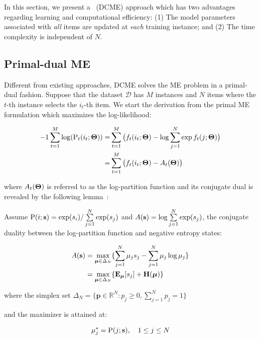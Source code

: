 \section{\DCME{}}\label{sec::dcme_dcme}

In this section, we present a \DCME{}~(DCME) approach which has two advantages
regarding learning and computational efficiency: (1) The model parameters
associated with \emph{all} items are updated at \emph{each} training instance;
and (2) The time complexity is independent of $N$.

\subsection{Primal-dual ME}

Different from existing approaches, DCME solves the ME problem in a primal-dual
fashion. Suppose that the dataset $\mathcal{D}$ has $M$ instances and $N$ items
where the $t$-th instance selects the $i_t$-th item. We start the derivation
from the primal ME formulation which maximizes the log-likelihood:

\begin{alignat}{-1}
  \sum\limits_{t=1}^M \log(\P_t(i_t; \THETA))=&
  \sum\limits_{t=1}^M \big(  f_t(i_t; \THETA)
  - \log \sum\limits_{j=1}^N \exp f_t(j; \THETA) \big) \nonumber\\
  =& \sum\limits_{t=1}^M \big(  f_t(i_t; \THETA) - A_t(\THETA) \big)
\label{eq::primal_ll}
\end{alignat}

where $A_t(\mathbf{\Theta})$ is referred to as the log-partition function and its
conjugate dual is revealed by the following
lemma~\cite{hiriart1993convex,wainwright2008graphical}:

\begin{lem}\label{lem::conj_dual}
  Assume $ \mathrm{P}(i; \mathbf{s}) = \exp(s_i) / \sum\limits_{j=1}^N \exp(s_j)$
  and $A(\mathbf{s}) = \log \sum\limits_{j = 1}^N \exp(s_j)$,
  the conjugate duality between the log-partition function and negative entropy
  states:

  \begin{align}
    A(\mathbf{s}) &= \max\limits_{\boldsymbol{\mu} \in \Delta_N}
                    \{ \sum\limits_{j=1}^N \mu_j s_j -
                       \sum\limits_{j=1}^N \mu_j \log \mu_j \} \nonumber \\
           &= \max\limits_{\boldsymbol{\mu} \in \Delta_N}
                    \{ \mathbf{E}_{\boldsymbol{\mu}} [s_j] + \mathbf{H}(\boldsymbol{\mu}) \} \label{eq::conj_dual}
  \end{align}

  where the simplex set
  $\Delta_N = \{\mathbf{p} \in \mathbb{R}^{N}:
  p_j \ge 0, \sum\limits_{j=1}^N p_j = 1\}$

  and the maximizer is attained at:

  \begin{align}
    \mu_j^* = \mathrm{P}(j; \mathbf{s}), \quad 1 \le j \le N \label{eq::conj_dual_sol}
  \end{align}

\end{lem}

